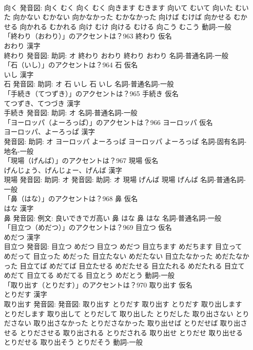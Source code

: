 \documentclass[8pt]{extreport}
\begin{document}
\begin{CJK}{UTF8}{min}
\\	向く 発音図:	向く むく		向く むく 向きます むきます 向いて むいて 向いた むいた 向かない むかない 向かなかった むかなかった 向けば むけば 向かせる むかせる 向かれる むかれる 向け むけ 向ける むける 向こう むこう				動詞-一般 
\\	「終わり（おわり）」のアクセントは？963	終わり 仮名　
\\	おわり 漢字　
\\	終わり 発音図: 助詞: オ	終わり おわり		終わり おわり				名詞-普通名詞-一般 
\\	「石（いし）」のアクセントは？964	石 仮名　
\\	いし 漢字　
\\	石 発音図: 助詞: オ	石 いし		石 いし				名詞-普通名詞-一般 
\\	「手続き（てつずき）」のアクセントは？965	手続き 仮名　
\\	てつずき、てつづき 漢字　
\\	手続き 発音図: 助詞: オ							名詞-普通名詞-一般 
\\	「ヨーロッパ（よーろっぱ）」のアクセントは？966	ヨーロッパ 仮名　
\\	ヨーロッパ、よーろっぱ 漢字　
\\	発音図: 助詞: オ	ヨーロッパ よーろっぱ		ヨーロッパ よーろっぱ				名詞-固有名詞-地名-一般 
\\	「現場（げんば）」のアクセントは？967	現場 仮名　
\\	げんじょう、げんじょー、げんば 漢字　
\\	現場 発音図: 助詞: オ 発音図: 助詞: オ	現場 げんば		現場 げんば				名詞-普通名詞-一般 
\\	「鼻（はな）」のアクセントは？968	鼻 仮名　
\\	はな 漢字　
\\	鼻 発音図: 例文: 良いできでガ高い	鼻 はな		鼻 はな				名詞-普通名詞-一般 
\\	「目立つ（めだつ）」のアクセントは？969	目立つ 仮名　
\\	めだつ 漢字　
\\	目立つ 発音図:	目立つ めだつ		目立つ めだつ 目立ちます めだちます 目立って めだって 目立った めだった 目立たない めだたない 目立たなかった めだたなかった 目立てば めだてば 目立たせる めだたせる 目立たれる めだたれる 目立て めだて 目立てる めだてる 目立とう めだとう				動詞-一般 
\\	「取り出す（とりだす）」のアクセントは？970	取り出す 仮名　
\\	とりだす 漢字　
\\	取り出す 発音図: 発音図:	取り出す とりだす		取り出す とりだす 取り出します とりだします 取り出して とりだして 取り出した とりだした 取り出さない とりださない 取り出さなかった とりださなかった 取り出せば とりだせば 取り出させる とりださせる 取り出される とりだされる 取り出せ とりだせ 取り出せる とりだせる 取り出そう とりだそう				動詞-一般 

\end{CJK}
\end{document}
